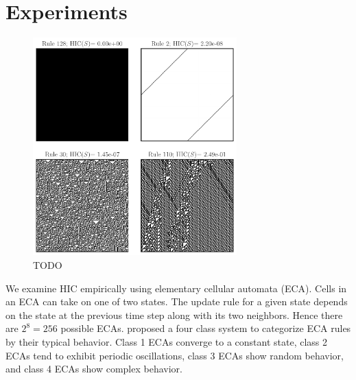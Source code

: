 \section{Experiments}

\begin{figure}[ht]
\centering
\includegraphics[width=0.7\textwidth]{figures/eca_images_and_hic}
\caption{TODO}
\label{fig:eca_images_and_hic}
\end{figure}

We examine HIC empirically using elementary cellular automata (ECA). Cells in
an ECA can take on one of two states. The update rule for a given state depends
on the state at the previous time step along with its two neighbors. Hence
there are $2^8 = 256$ possible ECAs. \citet{wolfram1983} proposed a four class
system to categorize ECA rules by their typical behavior. Class 1 ECAs converge
to a constant state, class 2 ECAs tend to exhibit periodic oscillations, class
3 ECAs show random behavior, and class 4 ECAs show complex behavior.

